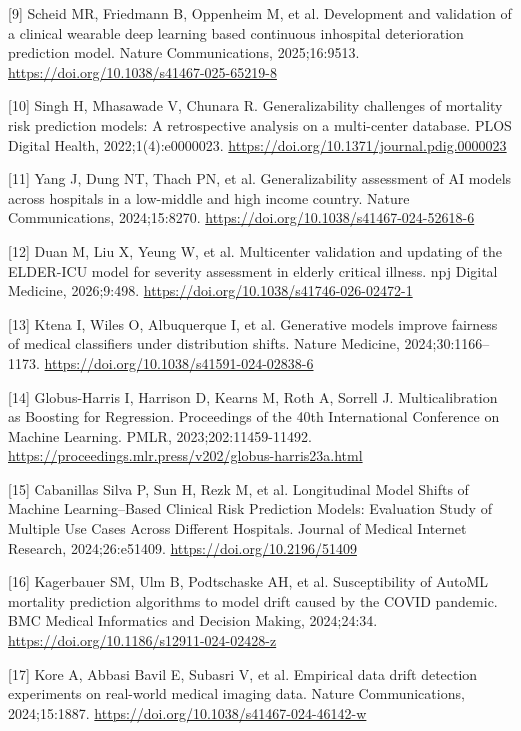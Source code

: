 \documentclass[11pt,a4paper]{article}
\begin{document}
{\small [9] Scheid MR, Friedmann B, Oppenheim M, et al. Development and validation of a clinical wearable deep learning based continuous inhospital deterioration prediction model. Nature Communications, 2025;16:9513. \url{https://doi.org/10.1038/s41467-025-65219-8}\par}
{\small [10] Singh H, Mhasawade V, Chunara R. Generalizability challenges of mortality risk prediction models: A retrospective analysis on a multi-center database. PLOS Digital Health, 2022;1(4):e0000023. \url{https://doi.org/10.1371/journal.pdig.0000023}\par}
{\small [11] Yang J, Dung NT, Thach PN, et al. Generalizability assessment of AI models across hospitals in a low-middle and high income country. Nature Communications, 2024;15:8270. \url{https://doi.org/10.1038/s41467-024-52618-6}\par}
{\small [12] Duan M, Liu X, Yeung W, et al. Multicenter validation and updating of the ELDER-ICU model for severity assessment in elderly critical illness. npj Digital Medicine, 2026;9:498. \url{https://doi.org/10.1038/s41746-026-02472-1}\par}
{\small [13] Ktena I, Wiles O, Albuquerque I, et al. Generative models improve fairness of medical classifiers under distribution shifts. Nature Medicine, 2024;30:1166–1173. \url{https://doi.org/10.1038/s41591-024-02838-6}\par}
{\small [14] Globus-Harris I, Harrison D, Kearns M, Roth A, Sorrell J. Multicalibration as Boosting for Regression. Proceedings of the 40th International Conference on Machine Learning. PMLR, 2023;202:11459-11492. \url{https://proceedings.mlr.press/v202/globus-harris23a.html}\par}
{\small [15] Cabanillas Silva P, Sun H, Rezk M, et al. Longitudinal Model Shifts of Machine Learning–Based Clinical Risk Prediction Models: Evaluation Study of Multiple Use Cases Across Different Hospitals. Journal of Medical Internet Research, 2024;26:e51409. \url{https://doi.org/10.2196/51409}\par}
{\small [16] Kagerbauer SM, Ulm B, Podtschaske AH, et al. Susceptibility of AutoML mortality prediction algorithms to model drift caused by the COVID pandemic. BMC Medical Informatics and Decision Making, 2024;24:34. \url{https://doi.org/10.1186/s12911-024-02428-z}\par}
{\small [17] Kore A, Abbasi Bavil E, Subasri V, et al. Empirical data drift detection experiments on real-world medical imaging data. Nature Communications, 2024;15:1887. \url{https://doi.org/10.1038/s41467-024-46142-w}\par}
\end{document}
